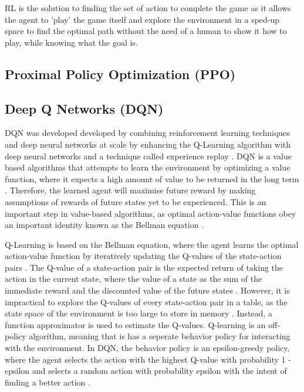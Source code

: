 RL is the solution to finding the set of action to complete the game as it allows the agent to 'play' the game itself and explore the environment in a sped-up space to find the optimal path without the need of a human to show it how to play, while knowing what the goal is. 

\subsection{Proximal Policy Optimization (PPO)}

\subsection{Deep Q Networks (DQN)}

DQN was developed developed by combining reinforcement learning techniques and deep neural networks at scale by enhancing the Q-Learning algorithm with deep neural networks and a technique called experience replay \cite{TFAgentsAuthors2023}. DQN is a value based algorithms that attempts to learn the environment by optimizing a value function, where it expects a high amount of value to be returned in the long term \cite{deepcheckRL}. Therefore, the learned agent will maximise future reward by making assumptions of rewards of future states yet to be experienced. This is an important step in value-based algorithms, as optimal action-value functions obey an important identity known as the Bellman equation \cite{mnih2013playing}. 

Q-Learning is based on the Bellman equation, where the agent learns the optimal action-value function by iteratively updating the Q-values of the state-action pairs \cite{mnih2013playing}. The Q-value of a state-action pair is the expected return of taking the action in the current state, where the value of a state as the sum of the immediate reward and the discounted value of the future states \cite{bellman1958dynamic}.  However, it is impractical to explore the Q-values of every state-action pair in a table, as the state space of the environment is too large to store in memory \cite{mnih2013playing}. Instead, a function approximator is used to estimate the Q-values. Q-learning is an off-policy algorithm, meaning that is has a seperate behavior policy for interacting with the environment. In DQN, the behavior policy is an epsilon-greedy policy, where the agent selects the action with the highest Q-value with probability 1 - epsilon and selects a random action with probability epsilon with the intent of finding a better action \cite{TFAgentsAuthors2023}.

